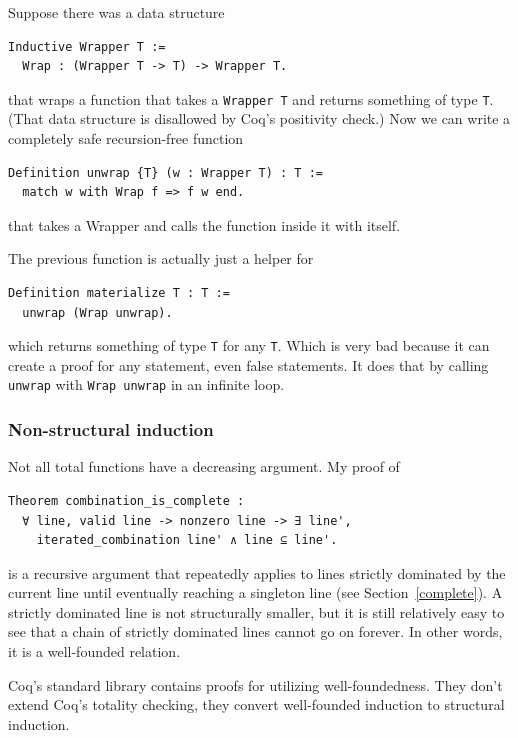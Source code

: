 \documentclass[english, 12pt, a4paper, sci, a-1b, online]{aaltothesis}
\newcommand\icoq[1]{\texttt{#1}}
\begin{document}
Suppose there was a data structure
\begin{verbatim}
Inductive Wrapper T :=
  Wrap : (Wrapper T -> T) -> Wrapper T.
\end{verbatim}
that wraps a function that takes a \icoq{Wrapper T} and returns something of type \icoq{T}. (That data structure is disallowed by Coq's positivity check.) Now we can write a completely safe recursion-free function
\begin{verbatim}
Definition unwrap {T} (w : Wrapper T) : T :=
  match w with Wrap f => f w end.
\end{verbatim}
that takes a Wrapper and calls the function inside it with itself.

The previous function is actually just a helper for
\begin{verbatim}
Definition materialize T : T :=
  unwrap (Wrap unwrap).
\end{verbatim}
which returns something of type \icoq{T} for any \icoq{T}. Which is very bad because it can create a proof for any statement, even false statements. It does that by calling \icoq{unwrap} with \icoq{Wrap unwrap} in an infinite loop.

\subsubsection{Non-structural induction}

Not all total functions have a decreasing argument. My proof of
\begin{verbatim}
Theorem combination_is_complete :
  ∀ line, valid line -> nonzero line -> ∃ line',
    iterated_combination line' ∧ line ⊆ line'.
\end{verbatim}
is a recursive argument that repeatedly applies to lines strictly dominated by the current line until eventually reaching a singleton line (see Section~\ref{complete}). A strictly dominated line is not structurally smaller, but it is still relatively easy to see that a chain of strictly dominated lines cannot go on forever. In other words, it is a well-founded relation.

Coq's standard library contains proofs for utilizing well-foundedness. They don't extend Coq's totality checking, they convert well-founded induction to structural induction.
\end{document}

